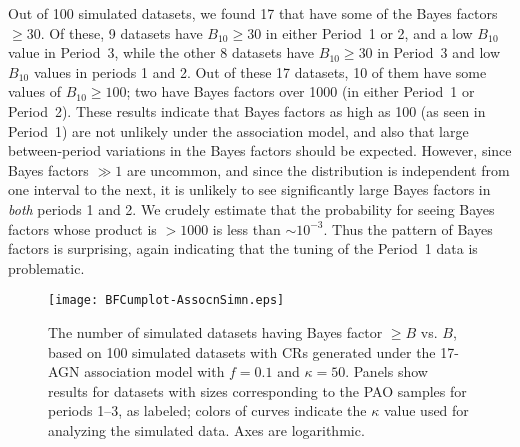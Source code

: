Out of 100 simulated datasets, we found 17 that have some of the Bayes
factors $\geq 30$.  Of these, 9 datasets have $B_{10}\geq 30$ in either
Period~1 or 2, and a low $B_{10}$ value in Period~3, while the other 8
datasets have $B_{10}\geq 30$ in Period~3 and low $B_{10}$ values in periods
1 and 2.  Out of these 17 datasets, 10 of them have some values of
$B_{10}\geq 100$; two have Bayes factors over 1000 (in either Period~1
or Period~2).  
These results indicate that Bayes factors as high as 100 (as seen in
Period~1) are not unlikely under the association model, and also that
large between-period variations in the Bayes factors should be expected.
However, since Bayes factors $\gg 1$ are uncommon, and since the
distribution is independent from one interval to the next, it is
unlikely to see significantly large Bayes factors in {\em both} periods
1 and 2.  We crudely estimate that the probability for seeing Bayes
factors whose product is $> 1000$ is less than $\sim 10^{-3}$.  Thus the
pattern of Bayes factors is surprising, again indicating that the tuning
of the Period~1 data is problematic.

\begin{figure}
\centerline{\texttt{[image: BFCumplot-AssocnSimn.eps]}}
\caption{The number of simulated datasets having Bayes factor $\geq B$
vs. $B$, based on 100 simulated datasets with CRs generated under the
17-AGN association model with $f=0.1$ and $\kappa=50$.  Panels show
results for datasets with sizes corresponding to the PAO samples for
periods 1--3, as labeled; colors of curves indicate the $\kappa$ value
used for analyzing the simulated data.  Axes are logarithmic.}
\label{fig:assocCumBF}
\end{figure}
